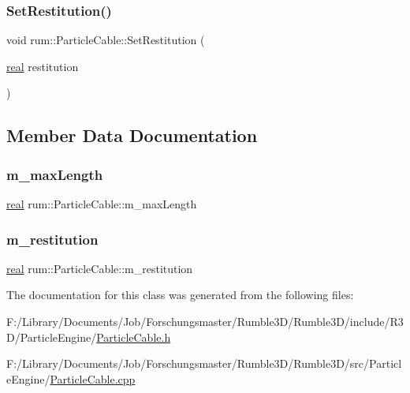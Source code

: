\subsubsection{\texorpdfstring{Set\+Restitution()}{SetRestitution()}}
{\footnotesize\ttfamily void rum\+::\+Particle\+Cable\+::\+Set\+Restitution (\begin{DoxyParamCaption}\item[{\hyperlink{namespacerum_a7e8cca23573d5eaead0f138cbaa4862c}{real}}]{restitution }\end{DoxyParamCaption})}



\subsection{Member Data Documentation}
\mbox{\label{classrum_1_1_particle_cable_a7232daf25d24eff2f98e03918bfbfb7c}} 
\subsubsection{\texorpdfstring{m\+\_\+max\+Length}{m\_maxLength}}
{\footnotesize\ttfamily \hyperlink{namespacerum_a7e8cca23573d5eaead0f138cbaa4862c}{real} rum\+::\+Particle\+Cable\+::m\+\_\+max\+Length\hspace{0.3cm}{\ttfamily [protected]}}

\mbox{\label{classrum_1_1_particle_cable_affbb776b02c85a36d0d0bb1ca6f4234a}} 
\subsubsection{\texorpdfstring{m\+\_\+restitution}{m\_restitution}}
{\footnotesize\ttfamily \hyperlink{namespacerum_a7e8cca23573d5eaead0f138cbaa4862c}{real} rum\+::\+Particle\+Cable\+::m\+\_\+restitution\hspace{0.3cm}{\ttfamily [protected]}}



The documentation for this class was generated from the following files\+:\begin{DoxyCompactItemize}
\item 
F\+:/\+Library/\+Documents/\+Job/\+Forschungsmaster/\+Rumble3\+D/\+Rumble3\+D/include/\+R3\+D/\+Particle\+Engine/\hyperlink{_particle_cable_8h}{Particle\+Cable.\+h}\item 
F\+:/\+Library/\+Documents/\+Job/\+Forschungsmaster/\+Rumble3\+D/\+Rumble3\+D/src/\+Particle\+Engine/\hyperlink{_particle_cable_8cpp}{Particle\+Cable.\+cpp}\end{DoxyCompactItemize}
